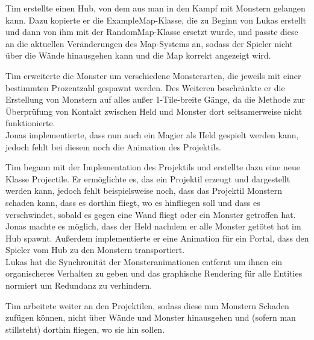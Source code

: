 Tim erstellte einen \glqq{}Hub\grqq{}, von dem aus man in den Kampf mit Monstern gelangen kann. Dazu kopierte er die ExampleMap-Klasse, die zu Beginn von Lukas erstellt und dann von ihm mit der RandomMap-Klasse ersetzt wurde, und passte diese an die aktuellen Veränderungen des Map-Systems an, sodass der Spieler nicht über die Wände hinausgehen kann und die Map korrekt angezeigt wird. \\


Tim erweiterte die Monster um verschiedene Monsterarten, die jeweils mit einer bestimmten Prozentzahl gespawnt werden. Des Weiteren beschränkte er die Erstellung von Monstern auf alles außer 1-Tile-breite Gänge, da die Methode zur Überprüfung von Kontakt zwischen Held und Monster dort seltsamerweise nicht funktionierte. \\
Jonas implementierte, dass nun auch ein Magier als Held gespielt werden kann, jedoch fehlt bei diesem noch die Animation des Projektils. \\


Tim begann mit der Implementation des Projektils und erstellte dazu eine neue Klasse \glqq{}Projectile\grqq{}. Er ermöglichte es, das ein Projektil erzeugt und dargestellt werden kann, jedoch fehlt beispielsweise noch, dass das Projektil Monstern schaden kann, dass es dorthin fliegt, wo es hinfliegen soll und dass es verschwindet, sobald es gegen eine Wand fliegt oder ein Monster getroffen hat. \\
Jonas machte es möglich, dass der Held nachdem er alle Monster getötet hat im Hub spawnt. Außerdem implementierte er eine Animation für ein Portal, dass den Spieler vom Hub zu den Monstern transportiert. \\
Lukas hat die Synchronität der Monsteranimationen entfernt um ihnen ein organischeres Verhalten zu geben und das graphische Rendering für alle Entities normiert um Redundanz zu verhindern.  \\


Tim arbeitete weiter an den Projektilen, sodass diese nun Monstern Schaden zufügen können, nicht über Wände und Monster hinausgehen und (sofern man stillsteht) dorthin fliegen, wo sie hin sollen. \\


